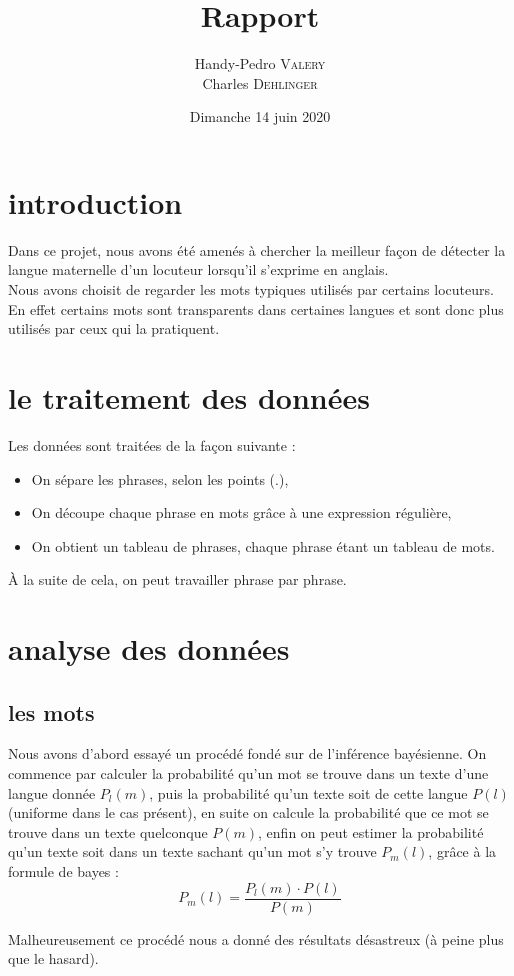 \documentclass[a4paper]{article}
\title{Rapport}
\author{ Handy-Pedro \textsc{Valery}\\
  Charles \textsc{Dehlinger}\\
}
\date{Dimanche 14 juin 2020}
\begin{document}
\maketitle
\tableofcontents

\section{introduction}
Dans ce projet, nous avons été amenés à chercher la meilleur façon de
détecter la langue maternelle d'un locuteur lorsqu'il s'exprime en
anglais.\\
Nous avons choisit de regarder les mots typiques utilisés par
certains locuteurs. En effet certains mots sont transparents dans
certaines langues et sont donc plus utilisés par ceux qui la
pratiquent.

\section{le traitement des données}
Les données sont traitées de la façon suivante :
\begin{itemize}
\item On sépare les phrases, selon les points (.),
\item On découpe chaque phrase en mots grâce à une expression
  régulière,
\item On obtient un tableau de phrases, chaque phrase étant un tableau
  de mots.
\end{itemize}
À la suite de cela, on peut travailler phrase par phrase.
\section{analyse des données}
\subsection{les mots}
Nous avons d'abord essayé un procédé fondé sur de l'inférence
bayésienne. On commence par calculer la probabilité qu'un mot se
trouve dans un texte d'une langue donnée $P_l(m)$, puis la probabilité
qu'un texte soit de cette langue $P(l)$ (uniforme dans le cas
présent), en suite on calcule la probabilité que ce mot se trouve dans
un texte quelconque $P(m)$, enfin on peut estimer la probabilité qu'un
texte soit dans un texte sachant qu'un mot s'y trouve $P_m(l)$, grâce
à la formule de bayes :
$$P_m(l) = \frac{P_l(m) \cdot P(l)}{P(m)}$$

Malheureusement ce procédé nous a donné des résultats désastreux (à
peine plus que le hasard).
\end{document}
